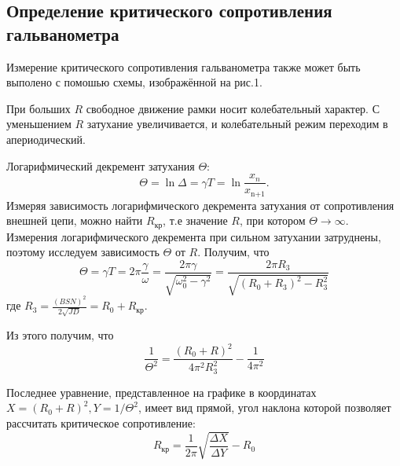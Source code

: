 \documentclass[12pt]{article}
\begin{document}
\subsection*{Определение критического сопротивления гальванометра}
\par
	Измерение критического сопротивления гальванометра также может быть выполено с помошью схемы, изображённой на рис.1.
\par
	При больших $R$ свободное движение рамки носит колебательный характер. С уменьшением $R$ затухание увеличивается, и колебательный режим переходим в апериодический.
\par
	Логарифмический декремент затухания $\Theta$:
\[
	\Theta = \ln \Delta = \gamma T = \ln \frac{x_n}{x_\text{n+1}}.
\]	
Измеряя зависимость логарифмического декремента затухания от сопротивления внешней цепи, можно найти $R_\text{кр}$, т.е значение $R$, при котором $\Theta \to \infty $. Измерения логарифмического декремента при сильном затухании затруднены, поэтому исследуем зависимость $\Theta$ от $R$. Получим, что
\[
	\Theta = \gamma T = 2 \pi \frac{\gamma}{\omega} = \frac{2 \pi \gamma}{\sqrt{\omega_0^2 - \gamma^2}} = \frac{2 \pi R_3}{\sqrt{\left(R_0 + R_3\right)^2 - R_3^2}}
\]				
где $R_3 = \frac{\left(BSN\right)^2}{2\sqrt{JD}} = R_0 + R_\text{кр}$.
\par 		
Из этого получим, что
\[
	\frac{1}{\Theta^2} = \frac{\left(R_0 + R\right)^2}{4 \pi^2 R_3^2} - \frac{1}{4\pi^2}
\]		 
\par
	Последнее уравнение, представленное на графике в координатах $X = \left(R_0 + R\right)^2, Y = 1 / \Theta^2$, имеет вид прямой, угол наклона которой позволяет рассчитать критическое сопротивление:
\[
	R_\text{кр} = \frac{1}{2 \pi} \sqrt{\frac{\Delta X}{\Delta Y}} - R_0 
\]
\newpage	 
\end{document}
